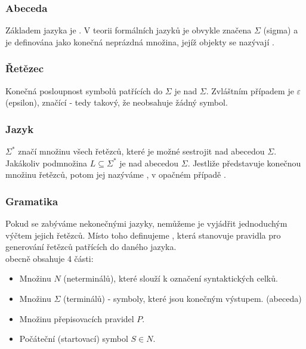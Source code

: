 \subsubsection*{Abeceda}

Základem jazyka je . V teorii formálních jazyků je obvykle značena
$\Sigma$ (sigma) a je definována jako konečná neprázdná množina, jejíž objekty
se nazývají .

\subsubsection*{Řetězec}

Konečná posloupnost symbolů patřících do $\Sigma$ je  nad $\Sigma$.
Zvláštním případem je $\varepsilon$ (epsilon), značící  -
tedy takový, že neobsahuje žádný symbol.

\subsubsection*{Jazyk}

$\Sigma^*$ značí množinu všech řetězců, které je možné sestrojit nad abecedou $\Sigma$.
Jakákoliv podmnožina $L \subseteq \Sigma^*$ je  nad abecedou $\Sigma$.
Jestliže  představuje konečnou množinu řetězců, potom jej nazýváme ,
v opačném případě .

\subsubsection*{Gramatika}

Pokud se zabýváme nekonečnými jazyky, nemůžeme je vyjádřit jednoduchým výčtem jejich
řetězců. Místo toho definujeme , která stanovuje pravidla pro generování
řetězců patřících do daného jazyka.\\

\noindent
{} obecně obsahuje 4 části:
\begin{itemize}
  \item Množinu  $N$ (neterminálů), které slouží k označení syntaktických celků.
  \item Množinu  $\Sigma$ (terminálů) - symboly, které jsou konečným výstupem. (abeceda)
  \item Množinu přepisovacích pravidel $P$.
  \item Počáteční (startovací) symbol $S \in N$.
\end{itemize}

